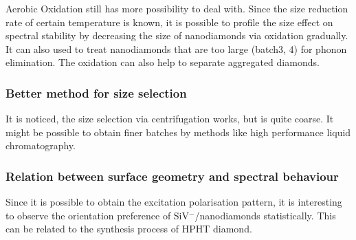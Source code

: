 Aerobic Oxidation still has more possibility to deal with. Since the size reduction rate of certain temperature is known, it is possible to profile the size effect on spectral stability by decreasing the size of nanodiamonds via oxidation gradually. It can also used to treat nanodiamonds that are too large (batch3, 4) for phonon elimination. The oxidation can also help to separate aggregated diamonds.

\subsubsection{Better method for size selection}
It is noticed, the size selection via centrifugation works, but is quite coarse. It might be possible to obtain finer batches by methods like high performance liquid chromatography. \citep{naoki_komatsu_chromatographic_2011}

\subsubsection{Relation between surface geometry and spectral behaviour}
Since it is possible to obtain the excitation polarisation pattern, it is interesting to observe the orientation preference of SiV$^{-}$/nanodiamonds statistically. This can be related to the synthesis process of HPHT diamond.
